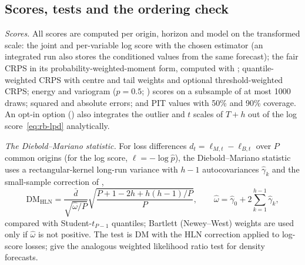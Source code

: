 \subsection{Scores, tests and the ordering check}\label{app:scores-tests}

\emph{Scores.}
All scores are computed per origin, horizon and model on the transformed scale: the joint and
per-variable log score with the chosen estimator (an integrated run also stores the conditioned
values from the same forecast); the fair CRPS in its probability-weighted-moment form, computed
with  \citep{zanetta2024scoringrules}; quantile-weighted CRPS with centre and tail
weights \citep{gneiting2011comparing} and optional threshold-weighted CRPS; energy
\citep{gneiting2007strictly} and variogram ($p = 0.5$; \citealp{scheuerer2015variogram}) scores on
a subsample of at most 1000 draws; squared and absolute errors; and PIT values with 50\% and 90\%
coverage.
An opt-in option () also integrates the outlier and $t$ scales of $T+h$
out of the log score~\eqref{eq:rb-lpd} analytically.

\emph{The Diebold--Mariano statistic.}
For loss differences $d_t = \ell_{M,t} - \ell_{B,t}$ over $P$ common origins (for the log score,
$\ell = -\log\hat p$), the Diebold--Mariano statistic \citep{diebold1995comparing} uses a
rectangular-kernel long-run variance with $h - 1$ autocovariances $\hat\gamma_k$ and the
small-sample correction of \citet{harvey1997testing},
\begin{equation}\label{eq:dm}
  \mathrm{DM}_{\mathrm{HLN}} = \frac{\bar d}{\sqrt{\hat\omega/P}}
  \sqrt{\frac{P + 1 - 2h + h(h-1)/P}{P}},\qquad
  \hat\omega = \hat\gamma_0 + 2\sum_{k=1}^{h-1}\hat\gamma_k ,
\end{equation}
compared with Student-$t_{P-1}$ quantiles; Bartlett (Newey--West) weights \citep{newey1987simple}
are used only if $\hat\omega$ is not positive.
The test is DM with the HLN correction applied to log-score losses; \citet{amisano2007comparing}
give the analogous weighted likelihood ratio test for density forecasts.

